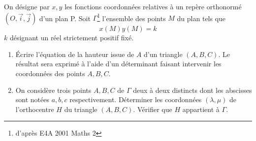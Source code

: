 On désigne par $x,y$ les fonctions coordonnées relatives à un repère orthonormé $(O,\overrightarrow{i},\overrightarrow{j})$ d'un plan P.\newline
Soit $\Gamma$\footnote{d'après E4A 2001 Maths 2} l'ensemble des points $M$ du plan tels que
\[x(M)y(M)=k\]
$k$ désignant un réel strictement positif fixé.
\begin{enumerate}
\item {\'E}crire l'équation de la hauteur issue de $A$ d'un triangle $(A,B,C)$.\newline
Le résultat sera exprimé à l'aide d'un déterminant faisant intervenir les coordonnées des points $A,B,C$.
\item On considère trois points $A,B,C$ de $\Gamma$ deux à deux distincts dont les abscisses sont notées $a,b,c$ respectivement.\newline
Déterminer les coordonnées $(\lambda,\mu)$ de l'orthocentre $H$ du triangle $(A,B,C)$. Vérifier que $H$ appartient à $\Gamma$.
\end{enumerate} 
